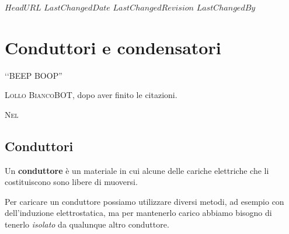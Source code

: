 \svnidlong
{$HeadURL$}
{$LastChangedDate$}
{$LastChangedRevision$}
{$LastChangedBy$}

\chapter{Conduttori e condensatori}

\begin{introduction}
	‘‘BEEP BOOP''
	\begin{flushright}
		\textsc{Lollo BiancoBOT}, dopo aver finito le citazioni. %
	\end{flushright}
\end{introduction}
\lettrine[findent=1pt, nindent=0pt]{N}{el} %

\section{Conduttori}
\begin{define}[Conduttore]
	Un \textbf{conduttore} è un materiale in cui alcune delle cariche elettriche che li costituiscono sono libere di muoversi.
\end{define}
Per caricare un conduttore possiamo utilizzare diversi metodi, ad esempio con dell'induzione elettrostatica, ma per mantenerlo carico abbiamo bisogno di tenerlo \textit{isolato} da qualunque altro conduttore.

